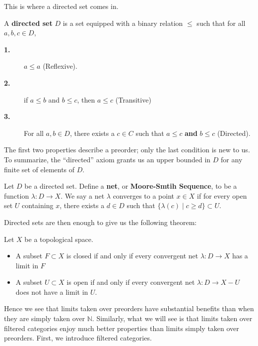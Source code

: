 This is where a directed set comes in. 
\begin{definition}
    A \textbf{directed set} $D$ is a set equipped with a binary relation $\le$ such that 
    for all $a, b, c \in D$,
    \begin{description}
        \item[\textbf{1.}] $a \le a$ (Reflexive).
        \item[\textbf{2.}] if $a \le b$ and $b \le c$, then $a \le c$ (Transitive)
        \item[\textbf{3.}] For all $a,b \in D$, there exists a $c \in C$ such that $a \le c$ \textbf{and} $b \le c$ (Directed).
    \end{description}
    The first two properties describe a preorder; only the last condition is new to us. 
    To summarize, the ``directed'' axiom grants us an upper bounded in $D$ for any finite 
    set of elements of $D$.  

    Let $D$ be a directed set. Define a \textbf{net}, or \textbf{Moore-Smtih Sequence}, 
    to be a function $\lambda: D \to X$. We say a net $\lambda$ converges to a point $x \in X$
    if for every open set $U$ containing $x$, there exists a $d \in D$ such that 
    $\{\lambda(c) \mid c \ge d\} \subset U$. 
\end{definition}

Directed sets are then enough to give us the following theorem:
\begin{theorem}
    Let $X$ be a topological space.
    \begin{itemize}
        \item A subset $F \subset X$ is closed if and only if every convergent 
        net $\lambda: D \to X$ has a limit in $F$
        \item A subset $U \subset X$ is open if and only if every convergent net 
        $\lambda: D \to X - U$ does not have a limit in $U$.
    \end{itemize}
\end{theorem}

Hence we see that limits taken over preorders have substantial benefits than when 
they are simply taken over $\mathbb{N}$. Similarly, what we will see is that 
limits taken over filtered categories enjoy much better properties than limits 
simply taken over preorders. First, we introduce filtered categories.


